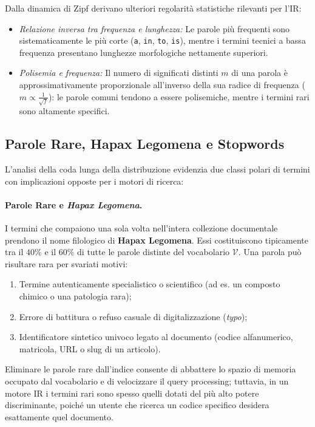 Dalla dinamica di Zipf derivano ulteriori regolarit\`a statistiche rilevanti per l'IR:
\begin{itemize}
    \item \textit{Relazione inversa tra frequenza e lunghezza:} Le parole pi\`u frequenti sono sistematicamente le pi\`u corte (\texttt{a}, \texttt{in}, \texttt{to}, \texttt{is}), mentre i termini tecnici a bassa frequenza presentano lunghezze morfologiche nettamente superiori.
    \item \textit{Polisemia e frequenza:} Il numero di significati distinti $m$ di una parola \`e approssimativamente proporzionale all'inverso della sua radice di frequenza ($m \propto \frac{1}{\sqrt{f}}$): le parole comuni tendono a essere polisemiche, mentre i termini rari sono altamente specifici.
\end{itemize}

\FloatBarrier
\subsection{Parole Rare, Hapax Legomena e Stopwords}
\label{subsec:rare-words-stopwords}

L'analisi della coda lunga della distribuzione evidenzia due classi polari di termini con implicazioni opposte per i motori di ricerca:

\paragraph{Parole Rare e \textit{Hapax Legomena}.}
I termini che compaiono una sola volta nell'intera collezione documentale prendono il nome filologico di \textbf{Hapax Legomena}. Essi costituiscono tipicamente tra il $40\%$ e il $60\%$ di tutte le parole distinte del vocabolario $\mathcal{V}$. 
Una parola pu\`o risultare rara per svariati motivi:
\begin{enumerate}
    \item Termine autenticamente specialistico o scientifico (ad es. un composto chimico o una patologia rara);
    \item Errore di battitura o refuso casuale di digitalizzazione (\textit{typo});
    \item Identificatore sintetico univoco legato al documento (codice alfanumerico, matricola, URL o slug di un articolo).
\end{enumerate}
Eliminare le parole rare dall'indice consente di abbattere lo spazio di memoria occupato dal vocabolario e di velocizzare il query processing; tuttavia, in un motore IR i termini rari sono spesso quelli dotati del pi\`u alto potere discriminante, poiché un utente che ricerca un codice specifico desidera esattamente quel documento.

